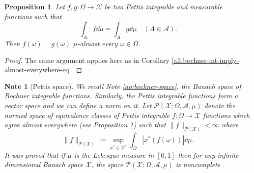 \documentclass[a4paper, 12pt]{article}
\newtheorem{state}[lem]{Proposition}
\newtheorem{note}[lem]{Note}
\begin{document}
\begin{state}\label{prop:pettis-integral-almost-everywhere-agrees} Let $f,g\colon \Omega \to \mathcal{X}$ be two Pettis integrable and measurable functions such that 
$$\int_{A} f \dd{\mu} = \int_{A} g \dd{\mu} \quad (A \in \mathcal{A}).$$
Then $f(\omega) = g(\omega)$ $\mu$-almost every $\omega \in \Omega$.
\end{state}
\begin{proof} The same argument applies here as in Corollary \ref{all:bochner-int-imply-almost-everywhere-eq}.
\end{proof}
\begin{note}[Pettis space]\normalfont We recall Note \ref{no:bochner-space}, the Banach space of Bochner integrable functions. Similarly, the Pettis integrable functions form a vector space and we can define a norm on it. Let $\mathcal{P}(\mathcal{X}; \Omega, \mathcal{A}, \mu)$ denote the normed space of equivalence classes of Pettis integrable $f\colon \Omega \to \mathcal{X}$ functions which agree almost everywhere (see Proposition \ref{prop:pettis-integral-almost-everywhere-agrees}) such that $\|f \|_{\mathcal{P}(\mathcal{X})} < \infty$ where
$$
\|f\|_{\mathcal{P}(\mathcal{X})} := \sup_{x^* \in \mathcal{X}^*} \int_{\Omega} | x^*(f(\omega)) | \dd{\mu}.
$$
It was proved that if $\mu$ is the Lebesgue measure in $[0,1]$ then for any infinite dimensional Banach space $\mathcal{X}$, the space $\mathcal{P}(\mathcal{X}; \Omega, \mathcal{A}, \mu)$ is noncomplete \cite{janicka-kalton1977}.
\end{note}
\end{document}
